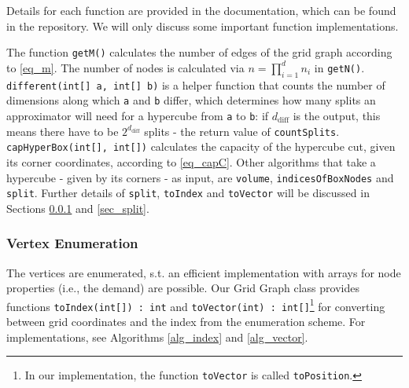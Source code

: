 Details for each function are provided in the documentation, which can be found in the repository. We will only discuss some important function implementations.

The function \texttt{getM()} calculates the number of edges of the grid graph according to \ref{eq_m}. The number of nodes is calculated via $n=\prod_{i=1}^dn_i$ in \texttt{getN()}. \texttt{different(int[] a, int[] b)} is a helper function that counts the number of dimensions along which \texttt{a} and \texttt{b} differ, which determines how many splits an approximator will need for a hypercube from \texttt{a} to \texttt{b}: if $d_{\text{diff}}$ is the output, this means there have to be $2^{d_{\text{diff}}}$ splits - the return value of \texttt{countSplits}.\\
\texttt{capHyperBox(int[], int[])} calculates the capacity of the hypercube cut, given its corner coordinates, according to \ref{eq_capC}. Other algorithms that take a hypercube - given by its corners - as input, are \texttt{volume}, \texttt{indicesOfBoxNodes} and \texttt{split}. Further details of \texttt{split}, \texttt{toIndex} and \texttt{toVector} will be discussed in Sections \ref{sec_venum} and \ref{sec_split}.

\subsubsection{Vertex Enumeration}
\label{sec_venum}
The vertices are enumerated, s.t. an efficient implementation with arrays for node properties (i.e., the demand) are possible. Our Grid Graph class provides functions \texttt{toIndex(int[]) : int} and \texttt{toVector(int) : int[]}\footnote{In our implementation, the function \texttt{toVector} is called \texttt{toPosition}.} for converting between grid coordinates and the index from the enumeration scheme. For implementations, see Algorithms \ref{alg_index} and \ref{alg_vector}.

